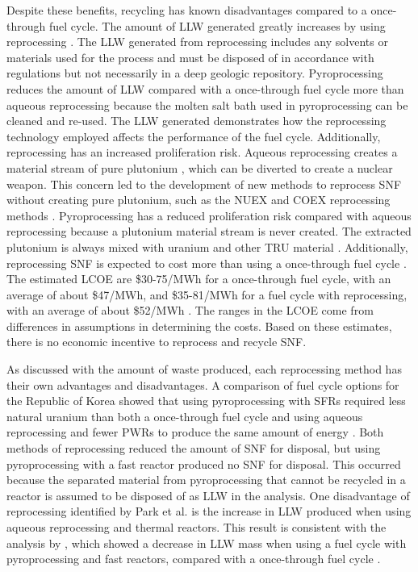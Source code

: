 Despite these benefits, recycling has known disadvantages compared to 
a once-through fuel cycle.
The amount of \gls{LLW} generated greatly increases by using 
reprocessing \cite{widder_benefits_2010}. The \gls{LLW} generated 
from reprocessing includes any solvents or materials used for the process 
and must be disposed of in accordance with regulations but not 
necessarily in a deep geologic repository.
Pyroprocessing reduces the amount of \gls{LLW} compared with 
a once-through fuel cycle more than aqueous reprocessing because
the molten salt bath used in pyroprocessing can be cleaned 
and re-used. The \gls{LLW} generated demonstrates how the reprocessing 
technology employed affects the performance of the fuel cycle. 
Additionally, reprocessing has an increased 
proliferation risk. Aqueous reprocessing creates a material stream of 
pure plutonium \cite{widder_benefits_2010}, which can be diverted to 
create a nuclear weapon.
This concern led to the development of new 
methods to reprocess \gls{SNF} without creating pure plutonium, such 
as the NUEX and COEX reprocessing methods \cite{widder_benefits_2010}. 
Pyroprocessing has a reduced proliferation risk compared with 
aqueous reprocessing
because a plutonium material stream is never created. The extracted 
plutonium is always mixed with uranium and other \gls{TRU} material 
\cite{noauthor_status_2021}.
Additionally, reprocessing \gls{SNF} is expected to cost more than 
using a once-through fuel cycle \cite{rodriguez-penalonga_review_2017,widder_benefits_2010}. 
The estimated 
\gls{LCOE} are \$30-75/MWh for a once-through fuel cycle, with an 
average of about \$47/MWh, and \$35-81/MWh for a fuel 
cycle with reprocessing, with an average of about \$52/MWh 
\cite{widder_benefits_2010}. The ranges in the \gls{LCOE} come from 
differences in assumptions in determining the costs. Based on these 
estimates, there is no economic incentive to reprocess and recycle 
\gls{SNF}. 

As discussed with the amount of waste produced, each reprocessing method 
has their own advantages and disadvantages. 
A comparison of fuel cycle options for the Republic of Korea 
showed that using pyroprocessing with \glspl{SFR} required less natural 
uranium than both a once-through fuel cycle and using aqueous reprocessing 
and fewer \glspl{PWR} to produce the same amount of energy 
\cite{park_comparative_2011}. Both methods of reprocessing  
reduced the amount of \gls{SNF} for disposal,
but using pyroprocessing with a fast reactor produced no \gls{SNF} for 
disposal. This occurred because the separated material from 
pyroprocessing that cannot be recycled in a reactor is assumed to be 
disposed of as \gls{LLW} in the analysis. One disadvantage of reprocessing 
identified by Park et al. is the increase in \gls{LLW} produced 
when using aqueous reprocessing and 
thermal reactors. This result is consistent with the analysis 
by \cite{widder_benefits_2010}, which showed a decrease in \gls{LLW} 
mass when using a fuel cycle with pyroprocessing and fast reactors, 
compared with a once-through fuel cycle \cite{park_comparative_2011}. 

